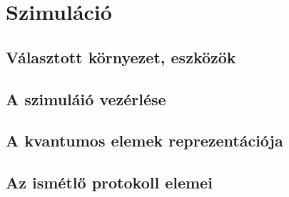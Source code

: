 \chapter{Szimuláció}

\section{Választott környezet, eszközök}

\section{A szimuláió vezérlése}

\section{A kvantumos elemek reprezentációja}

\section{Az ismétlő protokoll elemei }